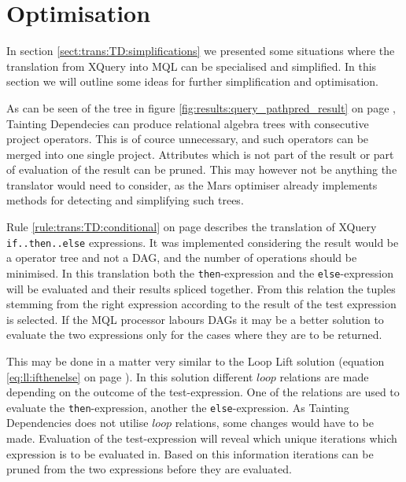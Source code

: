 \section{Optimisation}
\label{sect:disc:optimisations}

In section \ref{sect:trans:TD:simplifications} we presented some situations where the translation from XQuery into
MQL can be specialised and simplified. In this section we will outline some ideas for further simplification and
optimisation.

As can be seen of the tree in figure \ref{fig:results:query_pathpred_result} on page
\pageref{fig:results:query_pathpred_result}, Tainting Dependecies can produce relational algebra trees with
consecutive \textsf{project} operators. This is of cource unnecessary, and such operators can be merged into one
single \textsf{project}. Attributes which is not part of the result or part of evaluation of the result can be
pruned. This may however not be anything the translator would need to consider, as the Mars optimiser already
implements methods for detecting and simplifying such trees.

Rule \ref{rule:trans:TD:conditional} on page \pageref{rule:trans:TD:conditional} describes the translation of
XQuery \texttt{if..then..else} expressions. It was implemented considering the result would be a operator tree and
not a DAG, and the number of operations should be minimised. In this translation both the \texttt{then}-expression
and the \texttt{else}-expression will be evaluated and their results spliced together. From this relation the
tuples stemming from the right expression according to the result of the test expression is selected. If the MQL
processor labours DAGs it may be a better solution to evaluate the two expressions only for the cases where they
are to be returned. 

This may be done in a matter very similar to the Loop Lift solution (equation
\ref{eq:ll:ifthenelse} on page \pageref{eq:ll:ifthenelse}). In this solution different $loop$ relations are made
depending on the outcome of the test-expression. One of the relations are used to evaluate the
\texttt{then}-expression, another the \texttt{else}-expression. As Tainting Dependencies does not utilise $loop$
relations, some changes would have to be made. Evaluation of the test-expression will reveal which unique
iterations which expression is to be evaluated in. Based on this information iterations can be pruned from the two
expressions before they are evaluated.

